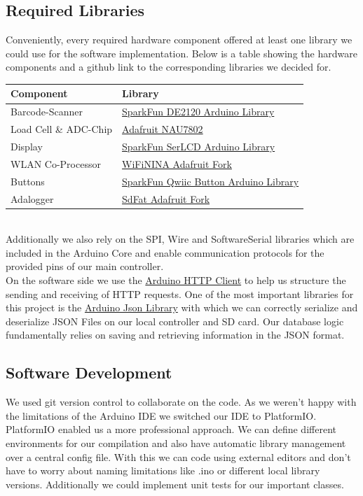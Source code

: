\documentclass{article}
\begin{document}
\subsection{Required Libraries}
Conveniently, every required hardware component offered at least one library we could use for the software implementation. 
Below is a table showing the hardware components and a github link to the corresponding libraries we decided for.
\\[10pt]
\begin{tabular}{l l}
	\hline
	Component              & Library\\
	\hline
	Barcode-Scanner        & \href{https://github.com/sparkfun/SparkFun_DE2120_Arduino_Library}{SparkFun DE2120 Arduino Library}\\
	Load Cell \& ADC-Chip  & \href{https://github.com/adafruit/Adafruit_NAU7802}{Adafruit NAU7802}\\
	Display                & \href{https://github.com/sparkfun/SparkFun_SerLCD_Arduino_Library}{SparkFun SerLCD Arduino Library}\\
	WLAN Co-Processor      & \href{https://github.com/adafruit/WiFiNINA}{WiFiNINA Adafruit Fork}\\
	Buttons                & \href{https://github.com/sparkfun/SparkFun_Qwiic_Button_Arduino_Library}{SparkFun Qwiic Button Arduino Library}\\
	Adalogger              & \href{https://github.com/adafruit/SdFat}{SdFat Adafruit Fork}\\
	\hline
\end{tabular} \\[10pt]
Additionally we also rely on the SPI, Wire and SoftwareSerial libraries which are included in the Arduino Core and enable communication protocols for the provided pins of our main controller. \\
On the software side we use the \href{https://github.com/arduino-libraries/ArduinoHttpClient}{Arduino HTTP Client} to help us structure the sending and receiving of HTTP requests.
One of the most important libraries for this project is the \href{https://github.com/bblanchon/ArduinoJson}{Arduino Json Library} with which we can correctly serialize and deserialize JSON Files on our local controller and SD card.
Our database logic fundamentally relies on saving and retrieving information in the JSON format. \\
\subsection{Software Development}
We used git version control to collaborate on the code.
As we weren't happy with the limitations of the Arduino IDE we switched our IDE to PlatformIO.
PlatformIO enabled us a more professional approach. We can define different environments for our compilation and also have automatic library management over a central config file.
With this we can code using external editors and don't have to worry about naming limitations like .ino or different local library versions. Additionally we could implement unit tests for our important classes.
\end{document}
